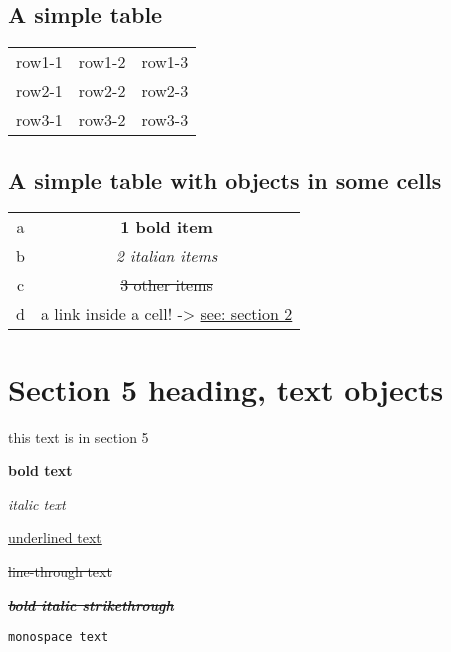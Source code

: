 \documentclass[11pt]{article}
\begin{document}
\subsection{A simple table  }
 \label{obj-244}
 \label{obj-243}
\begin{tabular}{|c|c|c|}
\hline
 row1-1  &  row1-2  &  row1-3  \\
 row2-1  &  row2-2  &  row2-3  \\
 row3-1  &  row3-2  &  row3-3  \\
\hline
\end{tabular}
\vspace{\baselineskip}
\subsection{A simple table with objects in some cells  }
 \label{obj-270}
 \label{obj-269}
\begin{tabular}{|c|c|}
\hline
 a  & \textbf{1 bold item} \\
 b  & \emph{2 italian items} \\
 c  & \sout{3 other items} \\
 d  & a link inside a cell! -\textgreater{} \hyperref[obj-42]{see: section 2} \\
\hline
\end{tabular}
\vspace{\baselineskip}
\section{Section 5 heading, text objects  }
 \label{obj-297}
 \label{obj-296}
this text is in section 5

\textbf{bold text}

\emph{italic text}

\underline{underlined text}

\sout{line-through text}

\textbf{\emph{\sout{bold italic strikethrough}}}

\vspace{\baselineskip}
\texttt{monospace text}
\end{document}
